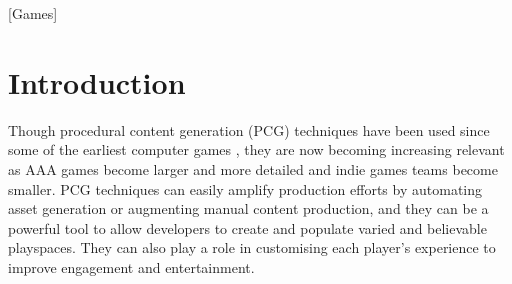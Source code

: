 \documentclass{acm_proc_article-sp}
\begin{document}
\begin{abstract}
\end{abstract}

[Games]



\section{Introduction}

Though procedural content generation (PCG) techniques have been used since some of the earliest computer games \cite{elite}, they are now becoming increasing relevant as AAA games become larger and more detailed and indie games teams become smaller. PCG techniques can easily amplify production efforts by automating asset generation or augmenting manual content production, and they can be a powerful tool to allow developers to create and populate varied and believable playspaces. They can also play a role in customising each player's experience to improve engagement and entertainment. 
\end{document}
